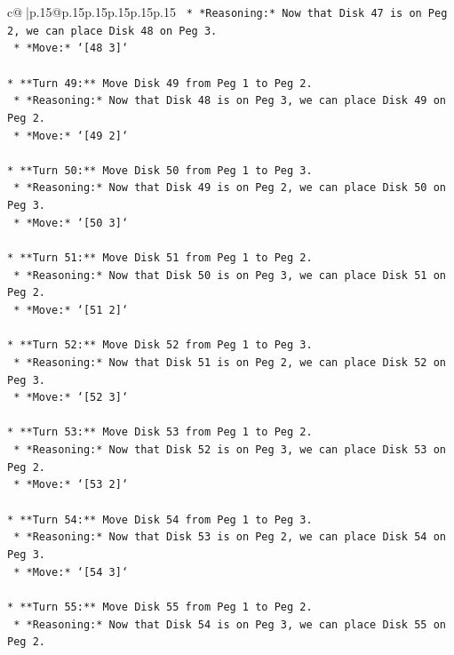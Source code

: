 \documentclass{article}
\begin{document}
{\begin{supertabular}{c@{$\;$}|p{.15\linewidth}@{}p{.15\linewidth}p{.15\linewidth}p{.15\linewidth}p{.15\linewidth}p{.15\linewidth}}
{{{\texttt{    *   *Reasoning:* Now that Disk 47 is on Peg 2, we can place Disk 48 on Peg 3.} \\
\texttt{    *   *Move:* `{[}48 3{]}`} \\
\\ 
\texttt{*   **Turn 49:** Move Disk 49 from Peg 1 to Peg 2.} \\
\texttt{    *   *Reasoning:* Now that Disk 48 is on Peg 3, we can place Disk 49 on Peg 2.} \\
\texttt{    *   *Move:* `{[}49 2{]}`} \\
\\ 
\texttt{*   **Turn 50:** Move Disk 50 from Peg 1 to Peg 3.} \\
\texttt{    *   *Reasoning:* Now that Disk 49 is on Peg 2, we can place Disk 50 on Peg 3.} \\
\texttt{    *   *Move:* `{[}50 3{]}`} \\
\\ 
\texttt{*   **Turn 51:** Move Disk 51 from Peg 1 to Peg 2.} \\
\texttt{    *   *Reasoning:* Now that Disk 50 is on Peg 3, we can place Disk 51 on Peg 2.} \\
\texttt{    *   *Move:* `{[}51 2{]}`} \\
\\ 
\texttt{*   **Turn 52:** Move Disk 52 from Peg 1 to Peg 3.} \\
\texttt{    *   *Reasoning:* Now that Disk 51 is on Peg 2, we can place Disk 52 on Peg 3.} \\
\texttt{    *   *Move:* `{[}52 3{]}`} \\
\\ 
\texttt{*   **Turn 53:** Move Disk 53 from Peg 1 to Peg 2.} \\
\texttt{    *   *Reasoning:* Now that Disk 52 is on Peg 3, we can place Disk 53 on Peg 2.} \\
\texttt{    *   *Move:* `{[}53 2{]}`} \\
\\ 
\texttt{*   **Turn 54:** Move Disk 54 from Peg 1 to Peg 3.} \\
\texttt{    *   *Reasoning:* Now that Disk 53 is on Peg 2, we can place Disk 54 on Peg 3.} \\
\texttt{    *   *Move:* `{[}54 3{]}`} \\
\\ 
\texttt{*   **Turn 55:** Move Disk 55 from Peg 1 to Peg 2.} \\
\texttt{    *   *Reasoning:* Now that Disk 54 is on Peg 3, we can place Disk 55 on Peg 2.} \\
}}}
\end{supertabular}}
\end{document}
